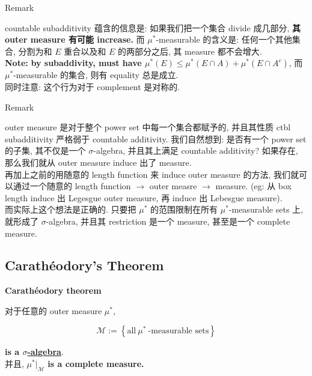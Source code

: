 \documentclass{qlnotes-export}
\begin{document}
\begin{qlremark}{Remark}

countable subadditivity 蕴含的信息是: 如果我们把一个集合 divide 成几部分, \textbf{其 outer measure 有可能 increase.} 而 \(\mu^{\ast}\)-measurable 的含义是: 任何一个其他集合, 分割为和 \(E\) 重合以及和 \(E\) 的两部分之后, 其 measure 都不会增大.\\
\textbf{Note:} \textbf{by subaddivity, must have \(\mu^{\ast}(E) \leq \mu^{\ast}(E \cap A) + \mu^{\ast}(E \cap A^{c})\)}, 而 \(\mu^{\ast}\)-measurable 的集合, 则有 equality 总是成立.\\
同时注意: 这个行为对于 complement 是对称的.

\end{qlremark}

\begin{qlremark}{Remark}

outer measure 是对于整个 power set 中每一个集合都赋予的, 并且其性质 ctbl subadditivity 严格弱于 countable additivity. 我们自然想到: 是否有一个 power set 的子集, 其不仅是一个 \(\sigma\)-algebra, 并且其上满足 countable additivity? 如果存在, 那么我们就从 outer measure induce 出了 measure.\\
再加上之前的用随意的 length function 来 induce outer measure 的方法, 我们就可以通过一个随意的 length function \(\rightarrow\) outer measre \(\rightarrow\) measure. (eg: 从 box length induce 出 Legesgue outer measure, 再 induce 出 Lebesgue measure).\\
而实际上这个想法是正确的. 只要把 \(\mu^{\ast}\) 的范围限制在所有 \(\mu^{\ast}\)-measurable sets 上, 就形成了 \(\sigma\)-algebra, 并且其 restriction 是一个 measure, 甚至是一个 complete measure.

\end{qlremark}

\subsection{Carathéodory's Theorem}\label{carathuxe9odorys-theorem}

\begin{theorem}{\protect{}\label{kn-caratheodory-theorem}{\textbf{Carathéodory
theorem}}}\label{thm-02-outer-measure-completion-of-a-measurable-space-theorem-003}

对于任意的 outer measure \(\mu^{\ast}\),

\[\mathcal{M} := \left\{ {\text{all}\ \mu^{\ast}\ \text{-measurable sets}} \right\}\]

\textbf{is a \href{https://qiulinfan.github.io/notes/math/measure-theory/\#kn-sigma-algebra}{\(\sigma\)-algebra}}.\\
并且, \(\mu^{\ast}|_{\mathcal{M}}\) \textbf{is a complete measure.}

\end{theorem}
\end{document}
